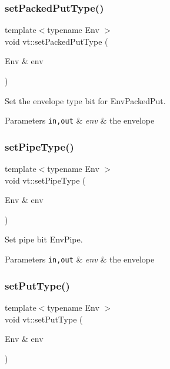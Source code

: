 \subsubsection{\texorpdfstring{set\+Packed\+Put\+Type()}{setPackedPutType()}}
{\footnotesize\ttfamily template$<$typename Env $>$ \\
void vt\+::set\+Packed\+Put\+Type (\begin{DoxyParamCaption}\item[{Env \&}]{env }\end{DoxyParamCaption})\hspace{0.3cm}{\ttfamily [inline]}}



Set the envelope type bit for {\ttfamily Env\+Packed\+Put}. 


\begin{DoxyParams}[1]{Parameters}
\mbox{\tt in,out}  & {\em env} & the envelope \\
\hline
\end{DoxyParams}
\mbox{\label{namespacevt_a4ecba7a91cd1d5a6b6473cbac2042c2b}} 
\subsubsection{\texorpdfstring{set\+Pipe\+Type()}{setPipeType()}}
{\footnotesize\ttfamily template$<$typename Env $>$ \\
void vt\+::set\+Pipe\+Type (\begin{DoxyParamCaption}\item[{Env \&}]{env }\end{DoxyParamCaption})\hspace{0.3cm}{\ttfamily [inline]}}



Set pipe bit {\ttfamily Env\+Pipe}. 


\begin{DoxyParams}[1]{Parameters}
\mbox{\tt in,out}  & {\em env} & the envelope \\
\hline
\end{DoxyParams}
\mbox{\label{namespacevt_ab25ac0a12270d261c2f5c3c634f6370e}} 
\subsubsection{\texorpdfstring{set\+Put\+Type()}{setPutType()}}
{\footnotesize\ttfamily template$<$typename Env $>$ \\
void vt\+::set\+Put\+Type (\begin{DoxyParamCaption}\item[{Env \&}]{env }\end{DoxyParamCaption})\hspace{0.3cm}{\ttfamily [inline]}}



